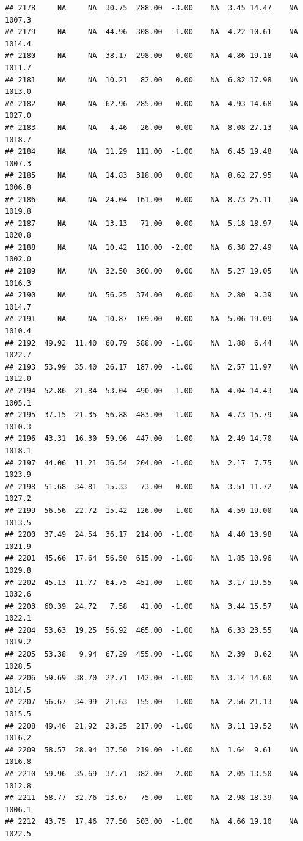 \documentclass{article}\usepackage{graphicx, color}
\makeatletter
\newenvironment{kframe}{%
 \def\at@end@of@kframe{}%
 \ifinner\ifhmode%
  \def\at@end@of@kframe{\end{minipage}}%
  \begin{minipage}{\columnwidth}%
 \fi\fi%
 \def\FrameCommand##1{\hskip\@totalleftmargin \hskip-\fboxsep
 \colorbox{shadecolor}{##1}\hskip-\fboxsep
     \hskip-\linewidth \hskip-\@totalleftmargin \hskip\columnwidth}%
 \MakeFramed {\advance\hsize-\width
   \@totalleftmargin\z@ \linewidth\hsize
   \@setminipage}}%
 {\par\unskip\endMakeFramed%
 \at@end@of@kframe}
\newenvironment{knitrout}{}{} %
\makeatother
\begin{document}
\begin{knitrout}
\begin{kframe}
\begin{verbatim}
## 2178     NA     NA  30.75  288.00  -3.00    NA  3.45 14.47    NA 1007.3
## 2179     NA     NA  44.96  308.00  -1.00    NA  4.22 10.61    NA 1014.4
## 2180     NA     NA  38.17  298.00   0.00    NA  4.86 19.18    NA 1011.7
## 2181     NA     NA  10.21   82.00   0.00    NA  6.82 17.98    NA 1013.0
## 2182     NA     NA  62.96  285.00   0.00    NA  4.93 14.68    NA 1027.0
## 2183     NA     NA   4.46   26.00   0.00    NA  8.08 27.13    NA 1018.7
## 2184     NA     NA  11.29  111.00  -1.00    NA  6.45 19.48    NA 1007.3
## 2185     NA     NA  14.83  318.00   0.00    NA  8.62 27.95    NA 1006.8
## 2186     NA     NA  24.04  161.00   0.00    NA  8.73 25.11    NA 1019.8
## 2187     NA     NA  13.13   71.00   0.00    NA  5.18 18.97    NA 1020.8
## 2188     NA     NA  10.42  110.00  -2.00    NA  6.38 27.49    NA 1002.0
## 2189     NA     NA  32.50  300.00   0.00    NA  5.27 19.05    NA 1016.3
## 2190     NA     NA  56.25  374.00   0.00    NA  2.80  9.39    NA 1014.7
## 2191     NA     NA  10.87  109.00   0.00    NA  5.06 19.09    NA 1010.4
## 2192  49.92  11.40  60.79  588.00  -1.00    NA  1.88  6.44    NA 1022.7
## 2193  53.99  35.40  26.17  187.00  -1.00    NA  2.57 11.97    NA 1012.0
## 2194  52.86  21.84  53.04  490.00  -1.00    NA  4.04 14.43    NA 1005.1
## 2195  37.15  21.35  56.88  483.00  -1.00    NA  4.73 15.79    NA 1010.3
## 2196  43.31  16.30  59.96  447.00  -1.00    NA  2.49 14.70    NA 1018.1
## 2197  44.06  11.21  36.54  204.00  -1.00    NA  2.17  7.75    NA 1023.9
## 2198  51.68  34.81  15.33   73.00   0.00    NA  3.51 11.72    NA 1027.2
## 2199  56.56  22.72  15.42  126.00  -1.00    NA  4.59 19.00    NA 1013.5
## 2200  37.49  24.54  36.17  214.00  -1.00    NA  4.40 13.98    NA 1021.9
## 2201  45.66  17.64  56.50  615.00  -1.00    NA  1.85 10.96    NA 1029.8
## 2202  45.13  11.77  64.75  451.00  -1.00    NA  3.17 19.55    NA 1032.6
## 2203  60.39  24.72   7.58   41.00  -1.00    NA  3.44 15.57    NA 1022.1
## 2204  53.63  19.25  56.92  465.00  -1.00    NA  6.33 23.55    NA 1019.2
## 2205  53.38   9.94  67.29  455.00  -1.00    NA  2.39  8.62    NA 1028.5
## 2206  59.69  38.70  22.71  142.00  -1.00    NA  3.14 14.60    NA 1014.5
## 2207  56.67  34.99  21.63  155.00  -1.00    NA  2.56 21.13    NA 1015.5
## 2208  49.46  21.92  23.25  217.00  -1.00    NA  3.11 19.52    NA 1016.2
## 2209  58.57  28.94  37.50  219.00  -1.00    NA  1.64  9.61    NA 1016.8
## 2210  59.96  35.69  37.71  382.00  -2.00    NA  2.05 13.50    NA 1012.8
## 2211  58.77  32.76  13.67   75.00  -1.00    NA  2.98 18.39    NA 1006.1
## 2212  43.75  17.46  77.50  503.00  -1.00    NA  4.66 19.10    NA 1022.5

\end{verbatim}
\end{kframe}
\end{knitrout}
\end{document}
